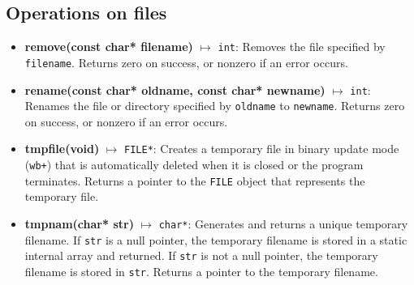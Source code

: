\documentclass{report}
\begin{document}
    \pagebreak 

    \bigbreak \noindent 
    \subsection{Operations on files}
    \begin{itemize}
        \item \textbf{remove(const char* filename)} $\mapsto$ \texttt{int}: Removes the file specified by \texttt{filename}. Returns zero on success, or nonzero if an error occurs.
        \item \textbf{rename(const char* oldname, const char* newname)} $\mapsto$ \texttt{int}: Renames the file or directory specified by \texttt{oldname} to \texttt{newname}. Returns zero on success, or nonzero if an error occurs.
        \item \textbf{tmpfile(void)} $\mapsto$ \texttt{FILE*}: Creates a temporary file in binary update mode (\texttt{wb+}) that is automatically deleted when it is closed or the program terminates. Returns a pointer to the \texttt{FILE} object that represents the temporary file.
        \item \textbf{tmpnam(char* str)} $\mapsto$ \texttt{char*}: Generates and returns a unique temporary filename. If \texttt{str} is a null pointer, the temporary filename is stored in a static internal array and returned. If \texttt{str} is not a null pointer, the temporary filename is stored in \texttt{str}. Returns a pointer to the temporary filename.
    \end{itemize}

    \bigbreak \noindent 
\end{document}
